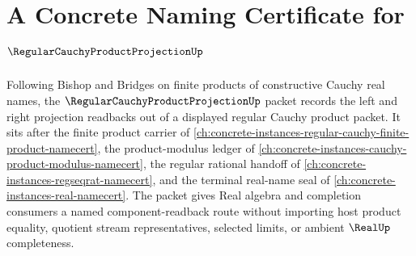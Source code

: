\chapter{A Concrete Naming Certificate for $\RegularCauchyProductProjectionUp$}
\label{ch:concrete-instances-regular-cauchy-product-projection-namecert}

Following Bishop and Bridges on finite products of constructive Cauchy real names, the $\RegularCauchyProductProjectionUp$ packet records the left and right projection readbacks out of a displayed regular Cauchy product packet. It sits after the finite product carrier of \autoref{ch:concrete-instances-regular-cauchy-finite-product-namecert}, the product-modulus ledger of \autoref{ch:concrete-instances-cauchy-product-modulus-namecert}, the regular rational handoff of \autoref{ch:concrete-instances-regseqrat-namecert}, and the terminal real-name seal of \autoref{ch:concrete-instances-real-namecert}. The packet gives Real algebra and completion consumers a named component-readback route without importing host product equality, quotient stream representatives, selected limits, or ambient $\RealUp$ completeness.

